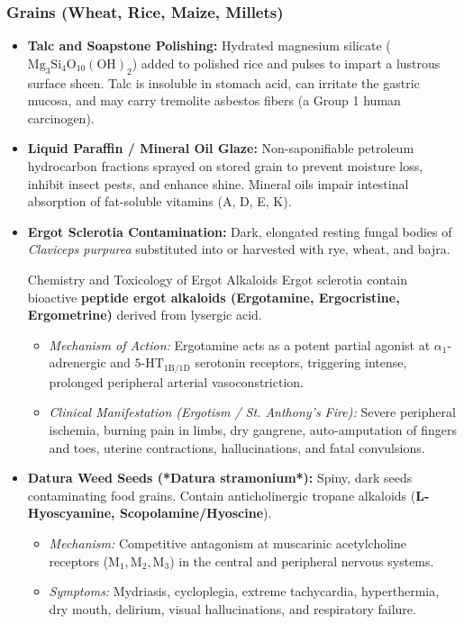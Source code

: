 \documentclass[11pt,a4paper,oneside]{article}
\begin{document}
\subsubsection{Grains (Wheat, Rice, Maize, Millets)}
\begin{itemize}[leftmargin=*]
    \item \textbf{Talc and Soapstone Polishing:} Hydrated magnesium silicate ($\mathrm{Mg_3Si_4O_{10}(OH)_2}$) added to polished rice and pulses to impart a lustrous surface sheen. Talc is insoluble in stomach acid, can irritate the gastric mucosa, and may carry tremolite asbestos fibers (a Group 1 human carcinogen).
    \item \textbf{Liquid Paraffin / Mineral Oil Glaze:} Non-saponifiable petroleum hydrocarbon fractions sprayed on stored grain to prevent moisture loss, inhibit insect pests, and enhance shine. Mineral oils impair intestinal absorption of fat-soluble vitamins (A, D, E, K).
    \item \textbf{Ergot Sclerotia Contamination:} Dark, elongated resting fungal bodies of \textit{Claviceps purpurea} substituted into or harvested with rye, wheat, and bajra.
    \begin{hazardbox}{Chemistry and Toxicology of Ergot Alkaloids}
    Ergot sclerotia contain bioactive \textbf{peptide ergot alkaloids (Ergotamine, Ergocristine, Ergometrine)} derived from lysergic acid.
    \begin{itemize}
        \item \textit{Mechanism of Action:} Ergotamine acts as a potent partial agonist at $\alpha_1$-adrenergic and $5\text{-HT}_{1\text{B/1D}}$ serotonin receptors, triggering intense, prolonged peripheral arterial vasoconstriction.
        \item \textit{Clinical Manifestation (Ergotism / St. Anthony's Fire):} Severe peripheral ischemia, burning pain in limbs, dry gangrene, auto-amputation of fingers and toes, uterine contractions, hallucinations, and fatal convulsions.
    \end{itemize}
    \end{hazardbox}
    \item \textbf{Datura Weed Seeds (*Datura stramonium*):} Spiny, dark seeds contaminating food grains. Contain anticholinergic tropane alkaloids (\textbf{L-Hyoscyamine, Scopolamine/Hyoscine}).
    \begin{itemize}
        \item \textit{Mechanism:} Competitive antagonism at muscarinic acetylcholine receptors ($\mathrm{M_1, M_2, M_3}$) in the central and peripheral nervous systems.
        \item \textit{Symptoms:} Mydriasis, cycloplegia, extreme tachycardia, hyperthermia, dry mouth, delirium, visual hallucinations, and respiratory failure.
    \end{itemize}
\end{itemize}
\end{document}
